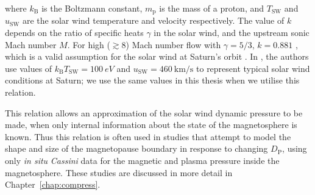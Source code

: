 where $k_\mathrm{B}$ is the Boltzmann constant, $m_\mathrm{p}$ is the mass of a proton, and $T_\mathrm{SW}$ and $u_\mathrm{SW}$ are the solar wind temperature and velocity respectively. The value of $k$ depends on the ratio of specific heats $\gamma$ in the solar wind, and the upstream sonic Mach number $M$. For high (${\gtrsim}8$) Mach number flow with $\gamma = 5/3$, $k = 0.881$ \citep{spreiter1966}, which is a valid assumption for the solar wind at Saturn's orbit \cite[e.g.][]{slavin1985,achilleos2006}. In \citet{pilkington2015}, the authors use values of $k_\mathrm{B}T_\mathrm{SW}=\SI{100}{eV}$ and $u_\mathrm{SW}=\SI{460}{\km\per\second}$ to represent typical solar wind conditions at Saturn; we use the same values in this thesis when we utilise this relation.

This relation allows an approximation of the solar wind dynamic pressure to be made, when only internal information about the state of the magnetosphere is known. Thus this relation is often used in studies that attempt to model the shape and size of the magnetopause boundary in response to changing $D_\mathrm{P}$, using only \textit{in situ} \textit{Cassini} data for the magnetic and plasma pressure inside the magnetosphere. These studies are discussed in more detail in Chapter~\ref{chap:compress}.

